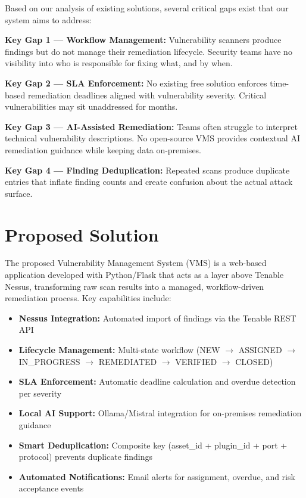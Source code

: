 Based on our analysis of existing solutions, several critical gaps exist that our system aims to address:

\begin{importantbox}
\textbf{Key Gap 1 — Workflow Management:} Vulnerability scanners produce findings but do not manage their remediation lifecycle. Security teams have no visibility into who is responsible for fixing what, and by when.

\textbf{Key Gap 2 — SLA Enforcement:} No existing free solution enforces time-based remediation deadlines aligned with vulnerability severity. Critical vulnerabilities may sit unaddressed for months.

\textbf{Key Gap 3 — AI-Assisted Remediation:} Teams often struggle to interpret technical vulnerability descriptions. No open-source VMS provides contextual AI remediation guidance while keeping data on-premises.

\textbf{Key Gap 4 — Finding Deduplication:} Repeated scans produce duplicate entries that inflate finding counts and create confusion about the actual attack surface.
\end{importantbox}

\section{Proposed Solution}

The proposed Vulnerability Management System (VMS) is a web-based application developed with Python/Flask that acts as a layer above Tenable Nessus, transforming raw scan results into a managed, workflow-driven remediation process. Key capabilities include:

\begin{itemize}
  \item \textbf{Nessus Integration:} Automated import of findings via the Tenable REST API
  \item \textbf{Lifecycle Management:} Multi-state workflow (NEW $\rightarrow$ ASSIGNED $\rightarrow$ IN\_PROGRESS $\rightarrow$ REMEDIATED $\rightarrow$ VERIFIED $\rightarrow$ CLOSED)
  \item \textbf{SLA Enforcement:} Automatic deadline calculation and overdue detection per severity
  \item \textbf{Local AI Support:} Ollama/Mistral integration for on-premises remediation guidance
  \item \textbf{Smart Deduplication:} Composite key (asset\_id + plugin\_id + port + protocol) prevents duplicate findings
  \item \textbf{Automated Notifications:} Email alerts for assignment, overdue, and risk acceptance events
\end{itemize}

